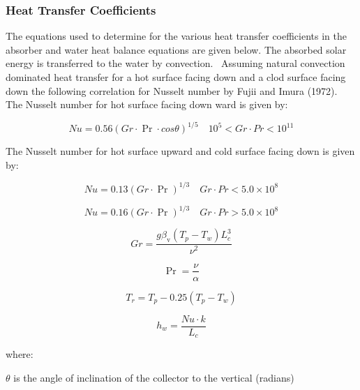 \subsubsection{Heat Transfer Coefficients}\label{heat-transfer-coefficients}

The equations used to determine for the various heat transfer coefficients in the absorber and water heat balance equations are given below. The absorbed solar energy is transferred to the water by convection.~ Assuming natural convection dominated heat transfer for a hot surface facing down and a clod surface facing down the following correlation for Nusselt number by Fujii and Imura (1972).~ The Nusselt number for hot surface facing down ward is given by:

\begin{equation}
Nu = 0.56{\left( {Gr \cdot \Pr  \cdot cos \theta } \right)^{1/5}}\quad {10^5} < Gr \cdot Pr < {10^{11}}
\end{equation}

The Nusselt number for hot surface upward and cold surface facing down is given by:

\begin{equation}
Nu = 0.13{\left( {Gr \cdot \Pr } \right)^{1/3}}\quad Gr \cdot Pr < 5.0 \times {10^8}
\end{equation}

\begin{equation}
Nu = 0.16{\left( {Gr \cdot \Pr } \right)^{1/3}}\quad Gr \cdot Pr > 5.0 \times {10^8}
\end{equation}

\begin{equation}
Gr = {\frac{{g{\beta_{\mathrm{v}}}\left( {{T_p} - {T_w}} \right)L_c^3}}{{\nu ^2}}}
\end{equation}

\begin{equation}
\Pr  = {\frac{\nu}{\alpha} }
\end{equation}

\begin{equation}
{T_r} = {T_p} - 0.25\left( {{T_p} - {T_w}} \right)
\end{equation}

\begin{equation}
{h_w} = {\frac{{Nu \cdot k}}{{L_c}}}
\end{equation}

where:

\(\theta\) is the angle of inclination of the collector to the vertical (radians)

